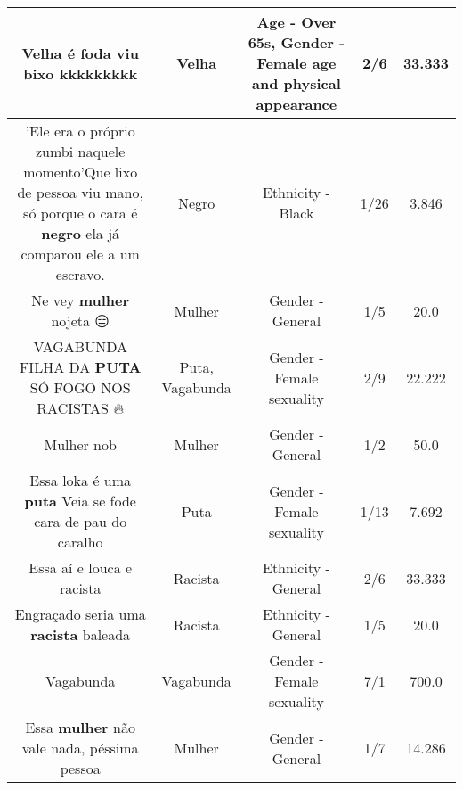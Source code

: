 \documentclass[11pt]{article}
\newlength\mylength
\begin{document}
\begin{center}
\begin{longtable}{|C{.65\mylength}|C{.30\mylength}|C{.12\mylength}|C{.12\mylength}|C{.12\mylength}|}
  \small Velha é foda viu bixo kkkkkkkkk\normalsize   & Velha & Age - Over 65s, Gender - Female age and physical appearance & 2/6 & 33.333 \\  \hline
  \small 'Ele era o próprio zumbi naquele momento'Que lixo de pessoa viu mano, só porque o cara é \textbf{negro} ela já comparou ele a um escravo.\normalsize   & Negro & Ethnicity - Black & 1/26 & 3.846 \\  \hline
  \small Ne vey \textbf{mulher} nojeta 😑\normalsize   & Mulher & Gender - General & 1/5 & 20.0 \\  \hline
  \small VAGABUNDA FILHA DA \textbf{PUTA} SÓ FOGO NOS RACISTAS 🔥\normalsize   & Puta, Vagabunda & Gender - Female sexuality & 2/9 & 22.222 \\  \hline
  \small Mulher nob\normalsize   & Mulher & Gender - General & 1/2 & 50.0 \\  \hline
  \small Essa loka é uma \textbf{puta} Veia se fode cara de pau do caralho\normalsize   & Puta & Gender - Female sexuality & 1/13 & 7.692 \\  \hline
  \small Essa aí e louca e racista\normalsize   & Racista & Ethnicity - General & 2/6 & 33.333 \\  \hline
  \small Engraçado seria uma \textbf{racista} baleada\normalsize   & Racista & Ethnicity - General & 1/5 & 20.0 \\  \hline
  \small Vagabunda\normalsize   & Vagabunda & Gender - Female sexuality & 7/1 & 700.0 \\  \hline
  \small Essa \textbf{mulher} não vale nada, péssima pessoa\normalsize   & Mulher & Gender - General & 1/7 & 14.286 \\  \hline

\end{longtable}
\end{center}
\end{document}
